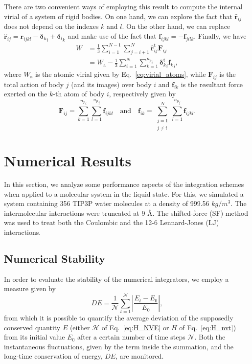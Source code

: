 \documentclass[aip,jcp,reprint,amsmath,amssymb]{revtex4-1}
\newcommand{\vt}[1]{\boldsymbol{\mathbf{#1}}}           %
\newcommand{\tr}[1]{#1^\text{t}}                               %
\begin{document}
There are two convenient ways of employing this result to compute the internal virial of a system of rigid bodies. On one hand, we can explore the fact that ${\hat{\vt r}}_{ij}$ does not depend on the indexes $k$ and $l$. On the other hand, we can replace $\hat{\vt r}_{ij} = {\vt r}_{ijkl} - {{\vt \delta}_k}_i + {{\vt \delta}_l}_k$ and make use of the fact that $\vt f_{ijkl} = -\vt f_{jilk}$. Finally, we have
\begin{subequations}
	\label{eq:virial_rigid_bodies}
	\begin{align}
	W &= \frac{1}{3} \sum_{i=1}^{N-1} \sum_{j=i+1}^N \tr{\hat{\vt r}}_{ij} \vt F_{ij} \\
	  &= W_\text{a} - \frac{1}{3} \sum_{i=1}^N \sum_{k=1}^{{n_p}_i} {\tr{\vt \delta}_k}_i {{\vt f}_k}_i,
	\end{align}
\end{subequations}
where $W_\text{a}$ is the atomic virial given by Eq.~\ref{eq:virial_atoms}, while $\vt F_{ij}$ is the total action of body $j$ (and its images) over body $i$ and $\vt f_{ik}$ is the resultant force exerted on the $k$-th atom of body $i$, respectively given by
\
\[
\vt F_{ij} = \sum_{k=1}^{{n_p}_i} \sum_{l=1}^{{n_p}_j} \vt f_{ijkl} \quad \text{and} \quad \vt f_{ik} = \sum_{\substack{j=1\\j \neq i}}^N \sum_{l=1}^{{n_p}_j} \vt f_{ijkl}.
\]

\section{Numerical Results}
\label{sec:numerical_results}

In this section, we analyze some performance aspects of the integration schemes when applied to a molecular system in the liquid state. For this, we simulated a system containing 356 TIP3P water molecules\cite{Price2004} at a density of 999.56 $kg/m^3$. The intermolecular interactions were truncated at 9 \AA. The shifted-force (SF) method\cite{Allen1989, Fennell2006, Toxvaerd_2011} was used to treat both the Coulombic and the 12-6 Lennard-Jones (LJ) interactions.

\subsection{Numerical Stability}
\label{sec:performance}

In order to evaluate the stability of the numerical integrators, we employ a measure given by\cite{Tuckerman2010}
\begin{equation}
\label{eq:performance}
D\!E =  \frac{1}{\mathcal N} \sum_{t=1}^{\mathcal N} \left| \frac{E_t - E_0}{E_0} \right|,
\end{equation}
from which it is possible to quantify the average deviation of the supposedly conserved quantity $E$ (either $\mathcal{H}$ of Eq.~\ref{eq:H_NVE} or $H$ of Eq.~\ref{eq:H_nvt}) from its initial value $E_0$ after a certain number of time steps $\mathcal N$. Both the instantaneous fluctuations, given by the term inside the summation, and the long-time conservation of energy, $D\!E$, are monitored.
\end{document}
